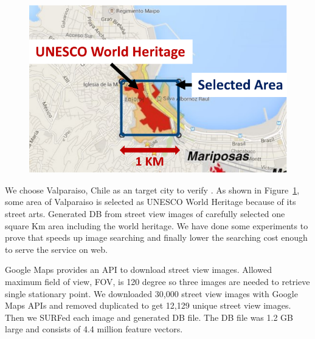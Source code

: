 

\begin{figure}[t]
	\centering
	\includegraphics[scale=0.64]{figs/crawled_area}
	\vspace{-0.1in}
	\vspace{-0.1in}
	\label{fig:crawled_area}
\end{figure}

We choose Valparaiso, Chile as an target city to verify \name{}.
As shown in Figure~\ref{fig:crawled_area}, some area of Valparaiso is selected as UNESCO World Heritage because of its street arts.
Generated DB from street view images of carefully selected one square Km area including the world heritage.
We have done some experiments to prove that \name{} speeds up image searching and finally lower the searching cost enough to serve the service on web.

Google Maps provides an API to download street view images.
Allowed maximum field of view, FOV, is 120 degree so three images are needed to retrieve single stationary point.
We downloaded 30,000 street view images with Google Maps APIs and removed duplicated to get 12,129 unique street view images.
Then we SURFed each image and generated DB file.
The DB file was 1.2 GB large and consists of 4.4 million feature vectors.

